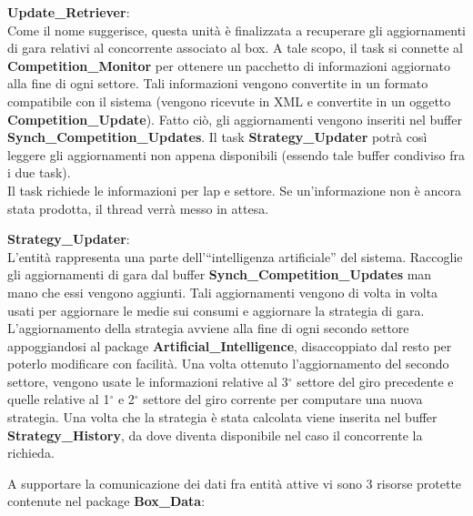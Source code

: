 \begin{description}
\item{\textbf{Update\_Retriever}}:\\
Come il nome suggerisce, questa unit\`{a} \`{e} finalizzata a recuperare gli aggiornamenti di gara relativi al concorrente associato al box.
A tale scopo, il task si connette al \textbf{Competition\_Monitor} per ottenere un pacchetto di informazioni aggiornato alla fine di ogni 
settore. Tali informazioni vengono convertite in un formato compatibile con il sistema (vengono ricevute in XML e convertite in un oggetto
\textbf{Competition\_Update}). Fatto ci\`{o}, gli aggiornamenti vengono inseriti nel buffer \textbf{Synch\_Competition\_Updates}. Il task
\textbf{Strategy\_Updater} potr\`{a} cos\`{i} leggere gli aggiornamenti non appena disponibili (essendo tale buffer condiviso fra i due task).\\
Il task richiede le informazioni per lap e settore. Se un'informazione non \`{e} ancora stata prodotta, il thread verr\`{a} messo in attesa.
\item{\textbf{Strategy\_Updater}}:\\
L'entit\`{a} rappresenta una parte dell'``intelligenza artificiale'' del sistema. Raccoglie gli aggiornamenti di gara dal buffer \textbf{Synch\_Competition\_Updates}
man mano che essi vengono aggiunti. Tali aggiornamenti vengono di volta in volta usati per aggiornare le medie sui consumi
e aggiornare la strategia di gara. L'aggiornamento della strategia avviene alla fine di ogni secondo settore appoggiandosi al package \textbf{Artificial\_Intelligence},
disaccoppiato dal resto per poterlo modificare con facilità.
Una volta ottenuto l'aggiornamento del secondo settore, vengono usate le informazioni relative al 3$^{\circ}$ settore del giro precedente e quelle
relative al 1$^{\circ}$ e 2$^{\circ}$ settore del giro corrente per computare una nuova strategia. Una volta che la strategia \`{e} stata calcolata
viene inserita nel buffer \textbf{Strategy\_History}, da dove diventa disponibile nel caso il concorrente la richieda.
\end{description}
A supportare la comunicazione dei dati fra entit\`{a} attive vi sono 3 risorse protette contenute nel package \textbf{Box\_Data}:
